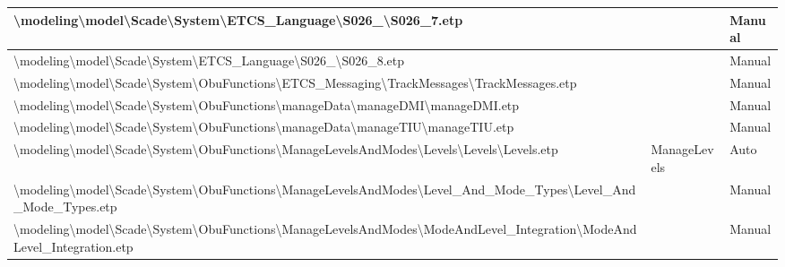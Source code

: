 \begin{longtable}{|>{\RaggedRight}p{}|>{\RaggedRight}p{}|>{\RaggedRight}p{}|}
\hline
\textbackslash modeling\textbackslash \allowbreak model\textbackslash \allowbreak Scade\textbackslash \allowbreak System\textbackslash \allowbreak ETCS\_\allowbreak Language\textbackslash \allowbreak S026\_\allowbreak 7\textbackslash \allowbreak S026\_\allowbreak 7.etp& &Manual\\
\hline
\textbackslash modeling\textbackslash \allowbreak model\textbackslash \allowbreak Scade\textbackslash \allowbreak System\textbackslash \allowbreak ETCS\_\allowbreak Language\textbackslash \allowbreak S026\_\allowbreak 8\textbackslash \allowbreak S026\_\allowbreak 8.etp& &Manual\\
\hline
\textbackslash modeling\textbackslash \allowbreak model\textbackslash \allowbreak Scade\textbackslash \allowbreak System\textbackslash \allowbreak ObuFunctions\textbackslash \allowbreak ETCS\_\allowbreak Messaging\textbackslash \allowbreak TrackMessages\textbackslash \allowbreak TrackMessages.etp& &Manual\\
\hline
\textbackslash modeling\textbackslash \allowbreak model\textbackslash \allowbreak Scade\textbackslash \allowbreak System\textbackslash \allowbreak ObuFunctions\textbackslash \allowbreak manageData\textbackslash \allowbreak manageDMI\textbackslash \allowbreak manageDMI.etp& &Manual\\
\hline
\textbackslash modeling\textbackslash \allowbreak model\textbackslash \allowbreak Scade\textbackslash \allowbreak System\textbackslash \allowbreak ObuFunctions\textbackslash \allowbreak manageData\textbackslash \allowbreak manageTIU\textbackslash \allowbreak manageTIU.etp& &Manual\\
\hline
\textbackslash modeling\textbackslash \allowbreak model\textbackslash \allowbreak Scade\textbackslash \allowbreak System\textbackslash \allowbreak ObuFunctions\textbackslash \allowbreak ManageLevelsAndModes\textbackslash \allowbreak Levels\textbackslash \allowbreak Levels\textbackslash \allowbreak Levels.etp&ManageLevels&Auto\\
\hline
\textbackslash modeling\textbackslash \allowbreak model\textbackslash \allowbreak Scade\textbackslash \allowbreak System\textbackslash \allowbreak ObuFunctions\textbackslash \allowbreak ManageLevelsAndModes\textbackslash \allowbreak Level\_\allowbreak And\_\allowbreak Mode\_\allowbreak Types\textbackslash \allowbreak Level\_\allowbreak And\_\allowbreak Mode\_\allowbreak Types.etp& &Manual\\
\hline
\textbackslash modeling\textbackslash \allowbreak model\textbackslash \allowbreak Scade\textbackslash \allowbreak System\textbackslash \allowbreak ObuFunctions\textbackslash \allowbreak ManageLevelsAndModes\textbackslash \allowbreak ModeAndLevel\_\allowbreak Integration\textbackslash \allowbreak ModeAndLevel\_\allowbreak Integration.etp& &Manual\\

\end{longtable}
